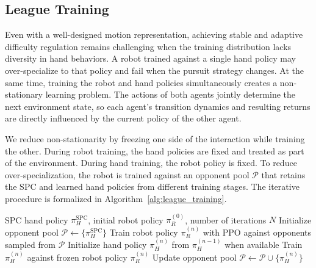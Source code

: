 \documentclass[lettersize,journal]{IEEEtran}
\begin{document}
\subsection{League Training}
Even with a well-designed motion representation, achieving stable and adaptive difficulty regulation remains challenging when the training distribution lacks diversity in hand behaviors. A robot trained against a single hand policy may over-specialize to that policy and fail when the pursuit strategy changes. At the same time, training the robot and hand policies simultaneously creates a non-stationary learning problem. The actions of both agents jointly determine the next environment state, so each agent's transition dynamics and resulting returns are directly influenced by the current policy of the other agent.

We reduce non-stationarity by freezing one side of the interaction while training the other. During robot training, the hand policies are fixed and treated as part of the environment. During hand training, the robot policy is fixed. To reduce over-specialization, the robot is trained against an opponent pool $\mathcal{P}$ that retains the SPC and learned hand policies from different training stages. The iterative procedure is formalized in Algorithm~\ref{alg:league_training}.

\begin{algorithm}[!t]
\caption{Iterative League Training}
\label{alg:league_training}
\begin{algorithmic}[1]
\Require SPC hand policy $\pi_H^{\mathrm{SPC}}$, initial robot policy $\pi_R^{(0)}$, number of iterations $N$
\State Initialize opponent pool $\mathcal{P}\leftarrow\{\pi_H^{\mathrm{SPC}}\}$
    \State Train robot policy $\pi_R^{(n)}$ with PPO against opponents sampled from $\mathcal{P}$
    \State Initialize hand policy $\pi_H^{(n)}$ from $\pi_H^{(n-1)}$ when available
    \State Train $\pi_H^{(n)}$ against frozen robot policy $\pi_R^{(n)}$
    \State Update opponent pool $\mathcal{P}\leftarrow\mathcal{P}\cup\{\pi_H^{(n)}\}$
\EndFor
\end{algorithmic}
\end{algorithm}
\end{document}
